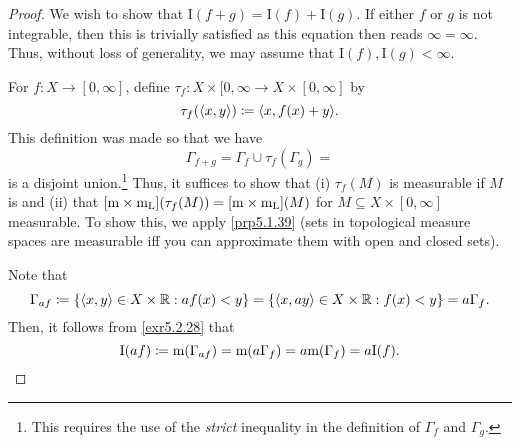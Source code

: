 \begin{thm}[Integral]
\begin{savenotes}
\begin{proof}
We wish to show that $\mathrm{I}(f+g)=\mathrm{I}(f)+\mathrm{I}(g)$.  If either $f$ or $g$ is not integrable, then this is trivially satisfied as this equation then reads $\infty =\infty$.  Thus, without loss of generality, we may assume that $\mathrm{I}(f),\mathrm{I}(g)<\infty$.

For $f:X\rightarrow [0,\infty ]$, define $\tau _f:X\times [0,\infty \rightarrow X\times [0,\infty ]$ by
\begin{equation}
\tau _f(\langle x,y\rangle)\coloneqq \langle x,f(x)+y\rangle.
\end{equation}
This definition was made so that we have
\begin{equation}
\Gamma _{f+g}=\Gamma _f\cup \tau _f(\Gamma _g)=
\end{equation}
is a disjoint union.\footnote{This requires the use of the \emph{strict} inequality in the definition of $\Gamma _f$ and $\Gamma _g$.}  Thus, it suffices to show that (i) $\tau _f(M)$ is measurable if $M$ is and (ii) that $[\mathrm{m} \times \mathrm{m} _{\mathrm{L}}](\tau _f(M))=[\mathrm{m} \times \mathrm{m} _{\mathrm{L}}](M)$ for $M\subseteq X\times [0,\infty ]$ measurable.  To show this, we apply \cref{prp5.1.39} (sets in topological measure spaces are measurable iff you can approximate them with open and closed sets).

Note that
\begin{equation}
\Gamma _{af}\coloneqq \left\{ \langle x,y\rangle\in X\times \mathbb{R} :af(x)<y\right\} =\left\{ \langle x,ay\rangle\in X\times \mathbb{R} :f(x)<y\right\} =a\Gamma _f.
\end{equation}
Then, it follows from \cref{exr5.2.28} that
\begin{equation}
\mathrm{I}(af)\coloneqq \mathrm{m} (\Gamma _{af})=\mathrm{m} (a\Gamma _f)=a\mathrm{m} (\Gamma _f)=a\mathrm{I}(f).
\end{equation}


\end{proof}
\end{savenotes}
\end{thm}
